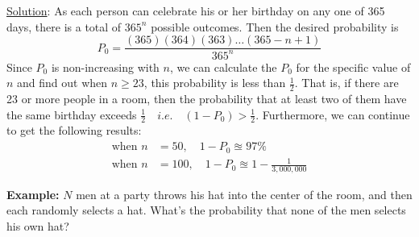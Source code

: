 \documentclass[11pt, letterpaper]{article}
\begin{document}
\noindent
\underline{Solution}: As each person can celebrate his or her birthday on any one of 365 days, there is a total of $365^n$ possible outcomes. Then the desired probability is
\begin{equation*}
  P_0 = \frac{(365)(364)(363)\dots(365-n+1)}{365^n}
\end{equation*}
Since $P_0$ is non-increasing with $n$, we can calculate the $P_0$ for the specific value of $n$ and find out when $n \ge 23$, this probability is less than $\frac{1}{2}$. That is, if there are 23 or more people in a room, then the probability that at least two of them have the same birthday exceeds $\frac{1}{2} \quad i.e. \quad (1-P_0) > \frac{1}{2}$. Furthermore, we can continue to get the following results:
\begin{align*}
  \text{when } n &= 50, \quad 1 - P_0 \approxeq 97\% \\
  \text{when } n &= 100, \quad 1 - P_0 \approxeq 1 - \frac{1}{3,000,000}
\end{align*}

\noindent
\textbf{Example: } $N$ men at a party throws his hat into the center of the room, and then each randomly selects a hat. What's the probability that none of the men selects his own hat?
\end{document}
